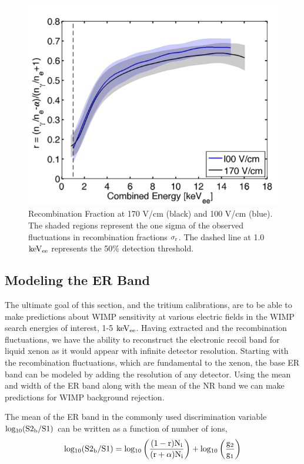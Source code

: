 \begin{figure}[h!]\centering
\includegraphics[width=120mm]{Chapter_Flucs/Figures/Iter1_100/R_comp.png}
\caption{Recombination Fraction at 170 V/cm (black) and 100 V/cm (blue). The shaded regions represent the one sigma of the observed fluctuations in recombination fractions $\rm \sigma_r$. The dashed line at 1.0 $\rm keV_{ee}$ represents the 50\% detection threshold.}
\label{fig:R_T}
\end{figure}

\newpage

\subsection{Modeling the ER Band}

The ultimate goal of this section, and the tritium calibrations, are to be able to make predictions about WIMP sensitivity at various electric fields in the WIMP search energies of interest, 1-5 $\rm keV_{ee}$. Having extracted \rp and the recombination fluctuations, we have the ability to reconstruct the electronic recoil band for liquid xenon as it would appear with infinite detector resolution. Starting with the recombination fluctuations, which are fundamental to the xenon, the base ER band can be modeled by adding the resolution of any detector. Using the mean and width of the ER band along with the mean of the NR band we can make predictions for WIMP background rejection.  

The mean of the ER band in the commonly used discrimination variable $\rm  log_{10}(S2_b/S1)$ can be written as a function of number of ions,
\begin{equation}
\rm log_{10}(S2_b/S1) = log_{10} \left(\frac{(1-r)N_i}{(r+\alpha)N_i}\right) + log_{10}\left(\frac{g_2}{g_1}\right)
\label{eq:Band_Mean}
\end{equation}

